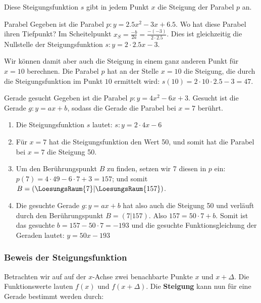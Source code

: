Diese Steigungsfunktion $s$ gibt in jedem Punkt $x$ die Steigung der
Parabel $p$ an.

\begin{beispiel}{Parabel}{}
  Gegeben ist die Parabel $p: y=2.5x^2 - 3x + 6.5$. Wo hat diese Parabel
  ihren Tiefpunkt? Im Scheitelpunkt $x_S =
  \frac{-b}{2a} = \frac{-(-3)}{2\cdot{}2.5}$. Dies ist gleichzeitig die Nullstelle der
  Steigungsfunktion $s: y= 2\cdot{}2.5x - 3$.

  Wir können damit aber auch die Steigung in einem ganz anderen Punkt
  \zB für $x=10$ berechnen. Die Parabel $p$ hat an der Stelle $x=10$
  die Steigung, die durch die Steigungsfunktion im Punkt $10$
  ermittelt wird: $s(10) = 2\cdot{}10\cdot{2.5} - 3 = 47$.
  
\end{beispiel}

\begin{beispiel}{Gerade gesucht}{}
Gegeben ist die Parabel $p: y=4x^2 -6x + 3$. Gesucht ist die Gerade
$g: y=ax+b$, sodass die Gerade die Parabel bei $x=7$ berührt.

\begin{enumerate}
\item Die Steigungsfunktion $s$ lautet: $s: y=2\cdot{}4x - 6$
\item Für $x=7$ hat die Steigungsfunktion den Wert 50, und somit hat
  die Parabel bei $x=7$ die Steigung 50.
\item Um den Berührungspunkt $B$ zu finden, setzen wir 7 diesen in $p$
  ein: $p(7)= 4\cdot{}49-6\cdot{}7+3 = 157$; und somit $B=(\LoesungsRaum{7}|\LoesungsRaum{157})$.
\item Die gesuchte Gerade $g: y=ax+b$ hat also auch die Steigung 50
  und verläuft durch den Berührungspunkt $B=(7|157)$. Also
  $157=50\cdot{}7+b$. Somit ist das gesuchte $b = 157-50\cdot{}7=-193$
  und die gesuchte Funktionsgleichung der Geraden lautet: $y = 50x-193$
  \end{enumerate}
\end{beispiel}
\newpage



\subsubsection{Beweis der Steigungsfunktion}

Betrachten wir auf auf der $x$-Achse zwei benachbarte Punkte $x$ und
$x+\Delta$. Die Funktionswerte lauten $f(x)$ und $f(x+\Delta)$. Die
\textbf{Steigung} kann nun für eine Gerade bestimmt werden durch:


